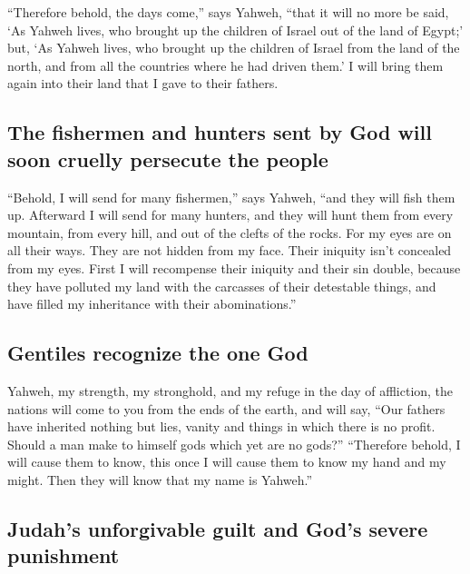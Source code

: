  ``Therefore behold, the days come,'' says Yahweh, ``that
it will no more be said, `As Yahweh lives, who brought up the children
of Israel out of the land of Egypt;'  but, `As Yahweh
lives, who brought up the children of Israel from the land of the north,
and from all the countries where he had driven them.' I will bring them
again into their land that I gave to their fathers.

\hypertarget{the-fishermen-and-hunters-sent-by-god-will-soon-cruelly-persecute-the-people}{%
\subsection{The fishermen and hunters sent by God will soon cruelly
persecute the
people}\label{the-fishermen-and-hunters-sent-by-god-will-soon-cruelly-persecute-the-people}}

 ``Behold, I will send for many fishermen,'' says Yahweh,
``and they will fish them up. Afterward I will send for many hunters,
and they will hunt them from every mountain, from every hill, and out of
the clefts of the rocks.  For my eyes are on all their
ways. They are not hidden from my face. Their iniquity isn't concealed
from my eyes.  First I will recompense their iniquity and
their sin double, because they have polluted my land with the carcasses
of their detestable things, and have filled my inheritance with their
abominations.''

\hypertarget{gentiles-recognize-the-one-god}{%
\subsection{Gentiles recognize the one
God}\label{gentiles-recognize-the-one-god}}

 Yahweh, my strength, my stronghold, and my refuge in the
day of affliction, the nations will come to you from the ends of the
earth, and will say, ``Our fathers have inherited nothing but lies,
vanity and things in which there is no profit.  Should a
man make to himself gods which yet are no gods?'' 
``Therefore behold, I will cause them to know, this once I will cause
them to know my hand and my might. Then they will know that my name is
Yahweh.''

\hypertarget{judahs-unforgivable-guilt-and-gods-severe-punishment}{%
\subsection{Judah's unforgivable guilt and God's severe
punishment}\label{judahs-unforgivable-guilt-and-gods-severe-punishment}}

